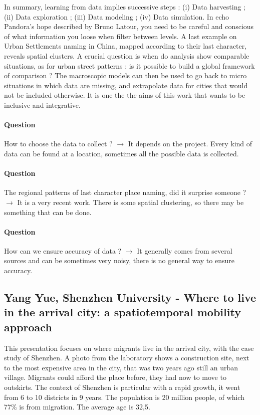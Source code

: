 \documentclass[10pt]{article}
\begin{document}
In summary, learning from data implies successive steps : (i) Data harvesting ; (ii) Data exploration ; (iii) Data modeling ; (iv) Data simulation. In echo Pandora's hope described by Bruno Latour, you need to be careful and conscious of what information you loose when filter between levels. A last example on Urban Settlements naming in China, mapped according to their last character, reveals spatial clusters. A crucial question is when do analysis show comparable situations, as for urban street patterns : is it possible to build a global framework of comparison ? The macroscopic models can then be used to go back to micro situations in which data are missing, and extrapolate data for cities that would not be included otherwise. It is one the the aims of this work that wants to be inclusive and integrative.


\paragraph{Question} 

How to choose the data to collect ? $\rightarrow$ It depends on the project. Every kind of data can be found at a location, sometimes all the possible data is collected.

\paragraph{Question}

The regional patterns of last character place naming, did it surprise someone ? $\rightarrow$ It is a very recent work. There is some spatial clustering, so there may be something that can be done.

\paragraph{Question}

How can we ensure accuracy of data ? $\rightarrow$ It generally comes from several sources and can be sometimes very noisy, there is no general way to ensure accuracy.



\subsection*{Yang Yue, Shenzhen University - Where to live in the arrival city: a spatiotemporal mobility approach}


This presentation focuses on where migrants live in the arrival city, with the case study of Shenzhen. A photo from the laboratory shows a construction site, next to the most expensive area in the city, that was two years ago still an urban village. Migrants could afford the place before, they had now to move to outskirts. The context of Shenzhen is particular with a rapid growth, it went from 6 to 10 districts in 9 years. The population is 20 million people, of which 77\% is from migration. The average age is 32,5.
\end{document}
